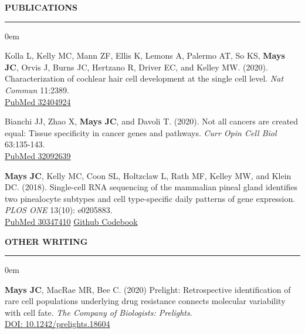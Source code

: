 \documentclass[11pt, letterpaper]{article}
\newenvironment{CVSection}{
\begin{addmargin}[2em]{0em}
\begin{samepage}}
{\end{samepage}
\end{addmargin}\bigskip}
\newcommand{\CVHeading}[1]{
\MakeUppercase{\bf #1}
\smallskip
\hrule
\medskip
}
\begin{document}


\CVHeading{Publications}
\begin{CVSection}

Kolla L, Kelly MC, Mann ZF, Ellis K, Lemons A, Palermo AT, So KS, \textbf{Mays JC}, Orvis J, Burns JC, Hertzano R, Driver EC, and Kelley MW. (2020). Characterization of cochlear hair cell development at the single cell level. \emph{Nat Commun} 11:2389.\\
\hspace{2 in}\href{https://www.ncbi.nlm.nih.gov/pubmed/32404924}{\faFileTextO\hspace{1mm}PubMed 32404924}\medskip

Bianchi JJ, Zhao X, \textbf{Mays JC}, and Davoli T. (2020). Not all cancers are created equal: Tissue specificity in cancer genes and pathways. \emph{Curr Opin Cell Biol} 63:135-143.\\
\hspace{2 in}\href{https://www.ncbi.nlm.nih.gov/pubmed/32092639}{\faFileTextO\hspace{1mm}PubMed 32092639}\medskip


\textbf{Mays JC}, Kelly MC, Coon SL, Holtzclaw L, Rath MF, Kelley MW, and Klein DC. (2018). Single-cell RNA sequencing of the mammalian pineal gland identifies two pinealocyte subtypes and cell type-specific daily patterns of gene expression. \emph{PLOS ONE} 13(10): e0205883.\\
\hspace{2 in}\href{https://www.ncbi.nlm.nih.gov/pubmed/30347410}{\faFileTextO\hspace{1mm}PubMed 30347410}
\hspace{2mm}\href{https://github.com/joeymays/PinealGland_SingleCell}{\faCode\hspace{1mm}Github Codebook}\medskip
\end{CVSection}

\CVHeading{Other Writing}
\begin{CVSection}
\textbf{Mays JC}, MacRae MR, Bee C. (2020) Prelight: Retrospective identification of rare cell populations underlying drug resistance connects molecular variability with cell fate. \emph{The Company of Biologists: Prelights}.\\
\href{https://doi.org/10.1242/prelights.18604}{DOI: 10.1242/prelights.18604}
\end{CVSection}
\end{document}
